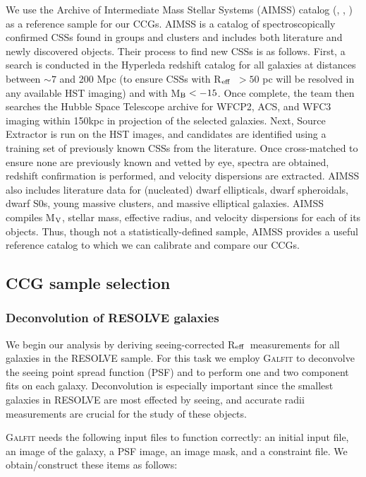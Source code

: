 \documentclass[iop,apj,twocolappendix]{emulateapj}
\newcommand{\Reff}{R$_{\rm eff}$}
\begin{document}
\noindent We use the Archive of Intermediate Mass Stellar Systems (AIMSS) catalog (\citet{Norris2014}, \citet{Forbes2014}, \citet{Janz2015}) as a reference sample for our CCGs.  AIMSS is a catalog of spectroscopically confirmed CSSs found in groups and clusters and includes both literature and newly discovered objects. Their process to find new CSSs is as follows. First, a search is conducted in the Hyperleda redshift catalog \citep{Paturel2003} for all galaxies at distances between $\sim 7$ and 200 Mpc (to ensure CSSs with \Reff\ $> 50$ pc will be resolved in any available HST imaging) and with M$_{\rm B} < -15$. Once complete, the team then searches the Hubble Space Telescope archive for WFCP2, ACS, and WFC3 imaging within 150kpc in projection of the selected galaxies. Next, Source Extractor is run on the HST images, and candidates are identified using a training set of previously known CSSs from the literature. Once cross-matched to ensure none are previously known and vetted by eye, spectra are obtained, redshift confirmation is performed, and velocity dispersions are extracted. AIMSS also includes literature data for (nucleated) dwarf ellipticals, dwarf spheroidals, dwarf S0s, young massive clusters, and massive elliptical galaxies. AIMSS compiles M$_{\rm V}$, stellar mass, effective radius, and velocity dispersions for each of its objects. Thus, though not a statistically-defined sample, AIMSS provides a useful reference catalog to which we can calibrate and compare our CCGs.

\subsection{CCG sample selection}

\subsubsection{Deconvolution of RESOLVE galaxies}
\label{deconv}

\noindent We begin our analysis by deriving seeing-corrected \Reff\ measurements for all galaxies in the RESOLVE sample. For this task we employ \textsc{Galfit} \citep{Peng2002} to deconvolve the seeing point spread function (PSF) and to perform one and two component fits on each galaxy. Deconvolution is especially important since the smallest galaxies in RESOLVE are most effected by seeing, and accurate radii measurements are crucial for the study of these objects. 

\textsc{Galfit} needs the following input files to function correctly: an initial input file, an image of the galaxy, a PSF image, an image mask, and a constraint file.  We obtain/construct these items as follows:
\end{document}
